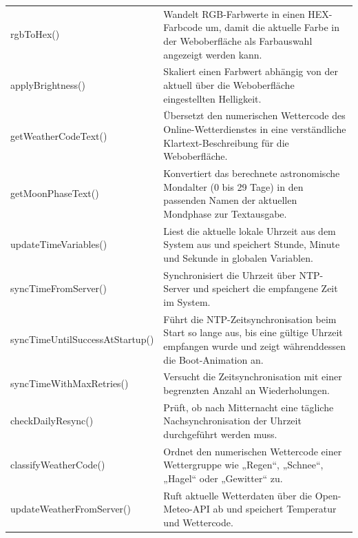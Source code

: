 \begin{longtable}{p{} p{}}
{\small\ttfamily rgbToHex()} &
Wandelt RGB-Farbwerte in einen HEX-Farbcode um, damit die aktuelle Farbe in der Weboberfläche als Farbauswahl angezeigt werden kann. \\

{\small\ttfamily applyBrightness()} &
Skaliert einen Farbwert abhängig von der aktuell über die Weboberfläche eingestellten Helligkeit. \\

{\small\ttfamily getWeatherCodeText()} &
Übersetzt den numerischen Wettercode des Online-Wetterdienstes in eine verständliche Klartext-Beschreibung für die Weboberfläche. \\

{\small\ttfamily getMoonPhaseText()} &
Konvertiert das berechnete astronomische Mondalter (0 bis 29 Tage) in den passenden Namen der aktuellen Mondphase zur Textausgabe. \\

{\small\ttfamily updateTimeVariables()} &
Liest die aktuelle lokale Uhrzeit aus dem System aus und speichert Stunde, Minute und Sekunde in globalen Variablen. \\

{\small\ttfamily syncTimeFromServer()} &
Synchronisiert die Uhrzeit über NTP-Server und speichert die empfangene Zeit im System. \\

{\small\ttfamily syncTimeUntilSuccessAtStartup()} &
Führt die NTP-Zeitsynchronisation beim Start so lange aus, bis eine gültige Uhrzeit empfangen wurde und zeigt währenddessen die Boot-Animation an. \\

{\small\ttfamily syncTimeWithMaxRetries()} &
Versucht die Zeitsynchronisation mit einer begrenzten Anzahl an Wiederholungen. \\

{\small\ttfamily checkDailyResync()} &
Prüft, ob nach Mitternacht eine tägliche Nachsynchronisation der Uhrzeit durchgeführt werden muss. \\

{\small\ttfamily classifyWeatherCode()} &
Ordnet den numerischen Wettercode einer Wettergruppe wie „Regen“, „Schnee“, „Hagel“ oder „Gewitter“ zu. \\

{\small\ttfamily updateWeatherFromServer()} &
Ruft aktuelle Wetterdaten über die Open-Meteo-API ab und speichert Temperatur und Wettercode. \\


\end{longtable}
